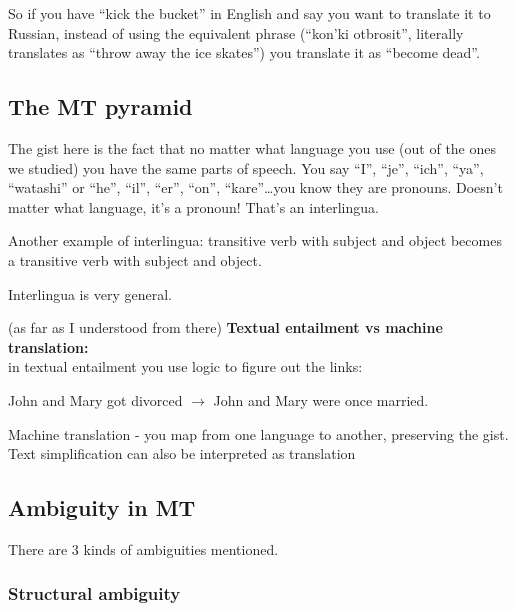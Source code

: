 So if you have ``kick the bucket'' in English and say you want to translate it
to Russian, instead of using the equivalent phrase (``kon'ki otbrosit'',
literally translates as ``throw away the ice skates'') you translate it as
``become dead''.

\subsection{The MT pyramid} 

The gist here is the fact that no matter what language you use (out of the ones
we studied) you have the same parts of speech. You say ``I'', ``je'', ``ich'',
``ya'', ``watashi'' or ``he'', ``il'', ``er'', ``on'', ``kare''\ldots you know 
they are pronouns. Doesn't matter what language, it's a pronoun! That's an
interlingua.

Another example of interlingua: transitive verb with subject and object becomes
a transitive verb with subject and object.

Interlingua is very general.

 (as far as I understood from there)  
\textbf{Textual entailment vs machine translation:}\\ 
in textual entailment you use logic to figure out the links:

John and Mary got divorced $\rightarrow$ John and Mary were once married.

Machine translation - you map from one language to another, preserving the gist.
Text simplification can also be interpreted as translation 

\subsection{Ambiguity in MT} 
There are 3 kinds of ambiguities mentioned. 
\subsubsection{Structural ambiguity}

